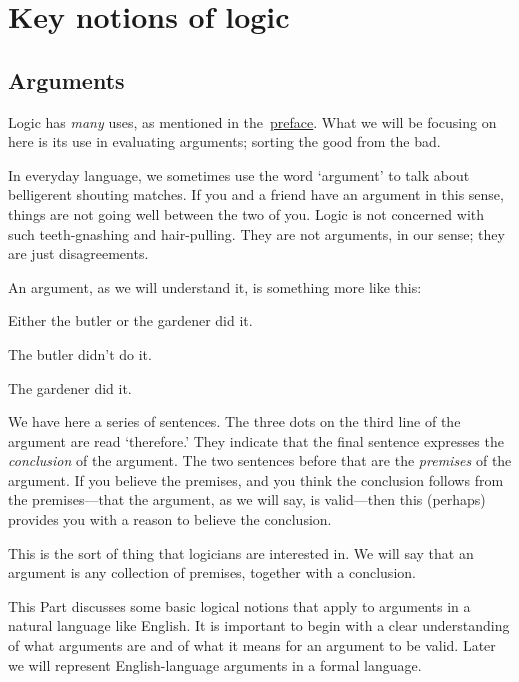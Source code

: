 \part{Key notions of logic}
\label{ch.intro}


\chapter{Arguments}
\label{s:Arguments}

Logic has \emph{many} uses, as mentioned in the~\hyperref[preface]{preface}. What we will be focusing on here is its use in evaluating arguments; sorting the good from the bad.

In everyday language, we sometimes use the word `argument' to talk about belligerent shouting matches.  If you and a friend have an argument in this sense, things are not going well between the two of you. Logic is not concerned with such teeth-gnashing and hair-pulling. They are not arguments, in our sense; they are just disagreements.

An argument, as we will understand it, is something more like this:
	\begin{earg}\label{argButlerGardner}
		\item Either the butler or the gardener did it.
		\item The butler didn't do it.
		\item[\texttherefore] The gardener did it.
	\end{earg}
We have here a series of sentences. The three dots on the third line of the argument are read `therefore.' They indicate that the final sentence expresses the \emph{conclusion} of the argument. The two sentences before that are the \emph{premises} of the argument. If you believe the premises, and you think the conclusion follows from the premises---that the argument, as we will say, is valid---then this (perhaps) provides you with a reason to believe the conclusion.

This is the sort of thing that logicians are interested in. We will say that an argument is any collection of premises, together with a conclusion.

This Part discusses some basic logical notions that apply to arguments in a natural language like English. It is important to begin with a clear understanding of what arguments are and of what it means for an argument to be valid. Later we will represent English-language arguments in a formal language. %

